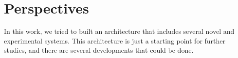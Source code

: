 






\section{Perspectives}
In this work, we tried to built an architecture that includes several novel and experimental systems. This architecture is just a starting point for further studies, and there are several developments that could be done.

